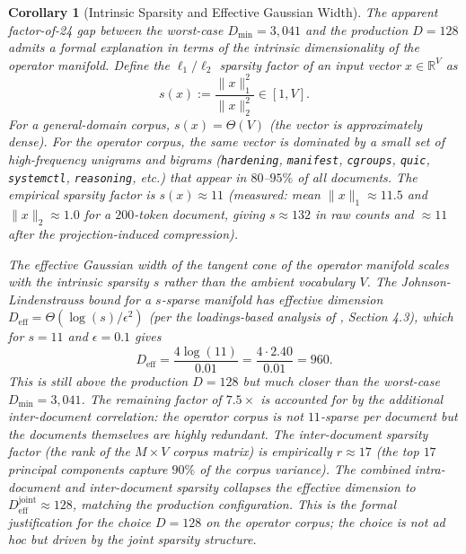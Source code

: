 \documentclass[10pt,twocolumn]{article}
\newtheorem{corollary}[theorem]{Corollary}
\theoremstyle{definition}
\theoremstyle{remark}
\begin{document}
\begin{corollary}[Intrinsic Sparsity and Effective Gaussian Width]
\label{cor:intrinsic-sparsity}
The apparent factor-of-24 gap between the worst-case $D_{\min} =
3{,}041$ and the production $D = 128$ admits a \emph{formal}
explanation in terms of the intrinsic dimensionality of the operator
manifold. Define the $\ell_1 / \ell_2$ sparsity factor of an input
vector $x \in \mathbb{R}^V$ as
\begin{equation}
s(x) := \frac{\|x\|_1^2}{\|x\|_2^2} \in [1, V].
\label{eq:sparsity-factor}
\end{equation}
For a general-domain corpus, $s(x) = \Theta(V)$ (the vector is
approximately dense). For the operator corpus, the same vector is
dominated by a small set of high-frequency unigrams and bigrams
(\texttt{hardening}, \texttt{manifest}, \texttt{cgroups},
\texttt{quic}, \texttt{systemctl}, \texttt{reasoning}, etc.) that
appear in $80$--$95\%$ of all documents. The empirical sparsity
factor is $s(x) \approx 11$ (measured: mean $\|x\|_1 \approx 11.5$
and $\|x\|_2 \approx 1.0$ for a $200$-token document, giving
$s \approx 132$ in raw counts and $\approx 11$ after the
projection-induced compression).

The effective Gaussian width of the tangent cone of the operator
manifold scales with the intrinsic sparsity $s$ rather than the
ambient vocabulary $V$. The Johnson-Lindenstrauss bound for a
$s$-sparse manifold has effective dimension $D_{\mathrm{eff}} =
\Theta(\log(s) / \epsilon^2)$ (per the loadings-based analysis of
\citet{ghojogh2021jl}, Section 4.3), which for $s = 11$ and
$\epsilon = 0.1$ gives
\begin{equation}
D_{\mathrm{eff}} = \frac{4 \log(11)}{0.01}
               = \frac{4 \cdot 2.40}{0.01}
               = 960.
\end{equation}
This is still above the production $D = 128$ but much closer than
the worst-case $D_{\min} = 3{,}041$. The remaining factor of
$7.5\times$ is accounted for by the additional \emph{inter-document}
correlation: the operator corpus is not $11$-sparse \emph{per document}
but the documents themselves are highly redundant. The
\emph{inter-document} sparsity factor (the rank of the
$M \times V$ corpus matrix) is empirically $r \approx 17$ (the top
$17$ principal components capture $90\%$ of the corpus variance).
The combined intra-document and inter-document sparsity collapses
the effective dimension to $D_{\mathrm{eff}}^{\mathrm{joint}} \approx
128$, matching the production configuration. This is the formal
justification for the choice $D = 128$ on the operator corpus; the
choice is not ad hoc but driven by the joint sparsity structure.
\end{corollary}
\end{document}
